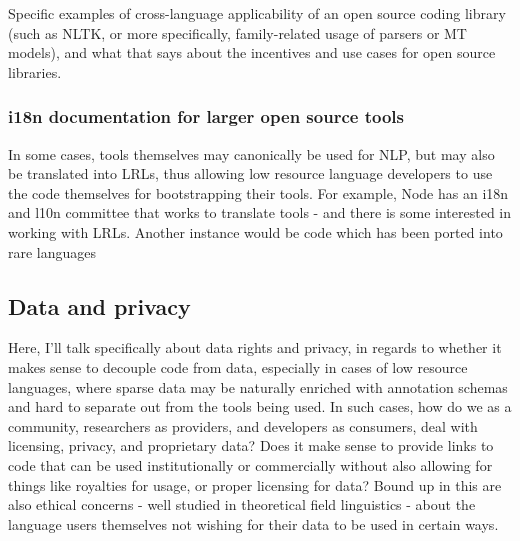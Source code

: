 Specific examples of cross-language applicability of an open source coding library (such as NLTK, or more specifically, family-related usage of parsers or MT models), and what that says about the incentives and use cases for open source libraries.

\subsubsection{i18n documentation for larger open source tools}

In some cases, tools themselves may canonically be used for NLP, but may also be translated into LRLs, thus allowing low resource language developers to use the code themselves for bootstrapping their tools. For example, Node has an i18n and l10n committee that works to translate tools - and there is some interested in working with LRLs. %
Another instance would be code which has been ported into rare languages %

%
%

\subsection{Data and privacy}
\label{subsec:data-and-privacy}

Here, I'll talk specifically about data rights and privacy, in regards to whether it makes sense to decouple code from data, especially in cases of low resource languages, where sparse data may be naturally enriched with annotation schemas and hard to separate out from the tools being used. In such cases, how do we as a community, researchers as providers, and developers as consumers, deal with licensing, privacy, and proprietary data? Does it make sense to provide links to code that can be used institutionally or commercially without also allowing for things like royalties for usage, or proper licensing for data? Bound up in this are also ethical concerns - well studied in theoretical field linguistics - about the language users themselves not wishing for their data to be used in certain ways.


